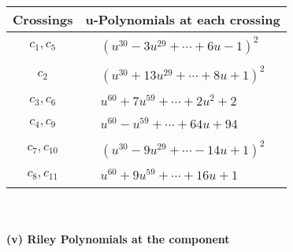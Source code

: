 \documentclass[1p]{elsarticle_modified}
\theoremstyle{definition}
\begin{document}
\begin{tabular}{m{50pt}|m{274pt}}
Crossings & \hspace{64pt}u-Polynomials at each crossing \\
\hline $$\begin{aligned}c_{1},c_{5}\end{aligned}$$&$\begin{aligned}
&(u^{30}-3 u^{29}+\cdots+6 u-1)^{2}
\end{aligned}$\\
\hline $$\begin{aligned}c_{2}\end{aligned}$$&$\begin{aligned}
&(u^{30}+13 u^{29}+\cdots+8 u+1)^{2}
\end{aligned}$\\
\hline $$\begin{aligned}c_{3},c_{6}\end{aligned}$$&$\begin{aligned}
&u^{60}+7 u^{59}+\cdots+2 u^2+2
\end{aligned}$\\
\hline $$\begin{aligned}c_{4},c_{9}\end{aligned}$$&$\begin{aligned}
&u^{60}- u^{59}+\cdots+64 u+94
\end{aligned}$\\
\hline $$\begin{aligned}c_{7},c_{10}\end{aligned}$$&$\begin{aligned}
&(u^{30}-9 u^{29}+\cdots-14 u+1)^{2}
\end{aligned}$\\
\hline $$\begin{aligned}c_{8},c_{11}\end{aligned}$$&$\begin{aligned}
&u^{60}+9 u^{59}+\cdots+16 u+1
\end{aligned}$\\
\hline
\end{tabular}\\~\\
\newpage\renewcommand{\arraystretch}{1}
\flushleft \textbf{(v) Riley Polynomials at the component}\newline \\
\end{document}
